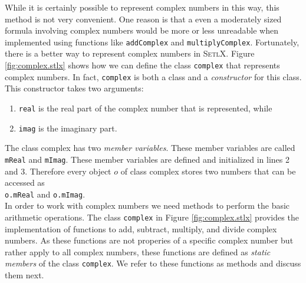 While it is certainly possible to represent complex numbers in this way, this method is not very convenient.
One reason is that a even a moderately sized formula involving complex numbers would be more or less unreadable 
when implemented using functions like \texttt{addComplex} and \texttt{multiplyComplex}.  Fortunately, there is 
a better way to represent complex numbers in \textsc{SetlX}.  Figure \ref{fig:complex.stlx} shows how we can define
the class \texttt{complex} that represents complex numbers.  In fact, \texttt{complex} is both a class and a 
\emph{constructor} for this class.  This constructor takes two arguments:
\begin{enumerate}
\item \texttt{real} is the real part of the complex number that is represented, while
\item \texttt{imag} is the imaginary part.
\end{enumerate}
The class complex has two \emph{member variables}.  These member variables are called \texttt{mReal} and \texttt{mImag}.
These member variables are defined and initialized in lines 2 and 3.  Therefore every object $o$ of class complex stores two 
numbers that can be accessed as
\\[0.2cm]
\hspace*{1.3cm}
\texttt{o.mReal} \quad and \quad \texttt{o.mImag}.
\\[0.2cm]
In order to work with complex numbers we need methods to perform the basic arithmetic operations.
The class \texttt{complex} in Figure \ref{fig:complex.stlx} provides the implementation of functions
to add, subtract, multiply, and divide complex numbers.  As these functions are not properies of a
specific complex number but rather apply to all complex numbers, these functions are defined as
\emph{static members} of the class \texttt{complex}.  We refer to these functions as methods and discuss 
them next.
